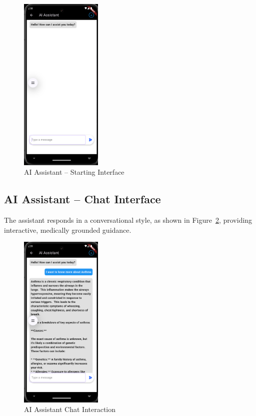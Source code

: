 \begin{figure}[H]
    \centering
    \includegraphics[width=0.35\textwidth]{images/UI_Screenshots/ai_assistant_screen_starting_screen.png}
    \caption{AI Assistant – Starting Interface}
    \label{fig:ai_start}
\end{figure}

\subsection{AI Assistant – Chat Interface}

The assistant responds in a conversational style, as shown in Figure~\ref{fig:ai_chat}, providing interactive, medically grounded guidance.

\begin{figure}[H]
    \centering
    \includegraphics[width=0.35\textwidth]{images/UI_Screenshots/ai_assistant_screen_chat_example.png}
    \caption{AI Assistant Chat Interaction}
    \label{fig:ai_chat}
\end{figure}

